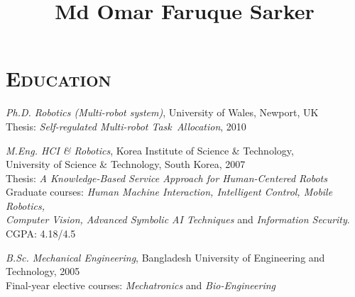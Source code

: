\documentclass[notopicbreak,contbibnum,plain]{simplecv}
\begin{document}


%
\title{\Large Md Omar Faruque Sarker}
%
\maketitle
\vspace*{-1cm}
\section{\textsc{Education}}
\label{edu}
\begin{topic}
    \item \emph{Ph.D. Robotics (Multi-robot system)}, 
    University of Wales, Newport, UK\\
    Thesis: \textit{Self-regulated Multi-robot 				Task~Allocation}, 2010
\vspace*{-0.1cm}
    \item \emph{M.Eng. HCI \& Robotics},  
    Korea Institute of Science \& Technology,\\ University of Science \& Technology, South Korea, 2007\\ 
        Thesis: \textit{A Knowledge-Based Service Approach
for Human-Centered Robots}\\
Graduate courses: \emph{Human Machine Interaction, Intelligent Control, Mobile Robotics,\\ Computer Vision, Advanced Symbolic AI
Techniques} and \emph{Information Security}. CGPA: 4.18/4.5
\vspace*{-0.1cm}
    \item \emph{B.Sc. Mechanical Engineering},
    Bangladesh University of Engineering and Technology, 2005\\       
Final-year elective courses: \emph{Mechatronics} and \emph{Bio-Engineering}
\end{topic}
\end{document}
